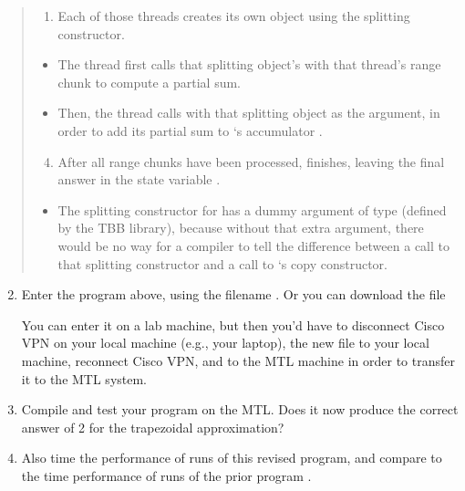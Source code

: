\documentclass[letterpaper,10pt,openany,oneside]{sphinxmanual}
\begin{document}
\begin{quote}
\begin{description}
\begin{itemize}
\begin{enumerate}
\item {} 
Each of those threads creates its own  object using the splitting constructor.

\end{enumerate}
\begin{itemize}
\item {} 
The thread first calls that splitting object's  with that thread's range chunk to compute a partial sum.

\item {} 
Then, the thread calls  with that splitting object as the argument, in order to add its partial sum to `s accumulator .

\end{itemize}
\begin{enumerate}
\setcounter{enumi}{3}
\item {} 
After all range chunks have been processed,  finishes, leaving the final answer in the  state variable .

\end{enumerate}
\begin{itemize}
\item {} 
The splitting constructor for  has a dummy argument of type  (defined by the TBB library), because without that extra argument, there would be no way for a compiler to tell the difference between a call to that splitting constructor and a call to `s copy constructor.

\end{itemize}

\end{itemize}

\end{description}\end{quote}
\begin{enumerate}
\setcounter{enumi}{1}
\item {} 
Enter the program above, using the filename . Or you can download the file 

You can enter it on a lab machine, but then you'd have to disconnect Cisco VPN on your local machine (e.g., your laptop),  the new file to your local machine, reconnect Cisco VPN, and  to the MTL machine in order to transfer it to the MTL system.

\item {} 
Compile and test your  program on the MTL. Does it now produce the correct answer of 2 for the trapezoidal approximation?

\item {} 
Also time the performance of runs of this revised program, and compare to the time performance of runs of the prior program .

\end{enumerate}



\renewcommand{\indexname}{Index}
\printindex
\end{document}
